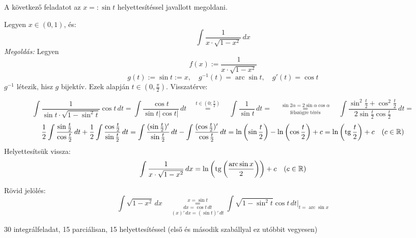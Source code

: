 \documentclass[a4paper,11.5pt]{article}
\DeclareMathOperator{\tg}{tg}
\DeclareMathOperator{\arc}{arc}
\begin{document}
	\begin{exercise}A következő feladatot az $x=:\sin t$ helyettesítéssel javallott megoldani. 
		
		Legyen $x\in(0,1)$, és:
		\[ \int\frac{1}{x\cdot\sqrt{1-x^2}}\,dx \]
		\textit{Megoldás:} Legyen
		\[ f(x):=\frac{1}{x\cdot\sqrt{1-x^2}} \]
		\[ g(t) := \sin t := x,\quad g^{-1}(t) = \arc\sin t,\quad g'(t) = \cos t \]
		$g^{-1}$ létezik, hisz $g$ bijektív. Ezek alapján $t\in\left(0,\frac{\pi}{2} \right)$. Visszatérve:
		
		\[ \int\frac{1}{\sin t\cdot\sqrt{1-\sin^2t}}\cos t\,dt=\int\frac{\cos t}{\sin t|\cos t|}\,dt\quad \overset{t\in\left(0;\frac{\pi}{2}\right)}{=}\quad\int\frac{1}{\sin t}\,dt=\quad \overset{\sin2\alpha=2\sin\alpha\cos\alpha}{\underset{\text{félszögre térés}}{=}}\quad \int\frac{\sin^2\frac{t}{2}+\cos^2\frac{t}{2}}{2\sin\frac{t}{2}\cos\frac{t}{2}}\,dt=\]
		\[\frac{1}{2}\int\frac{\sin\frac{t}{2}}{\cos\frac{t}{2}}\,dt+\frac{1}{2}\int\frac{\cos\frac{t}{2}}{\sin\frac{t}{2}}\,dt=\int\frac{(\sin\frac{t}{2})'}{\sin\frac{t}{2}}\,dt-\int\frac{(\cos\frac{t}{2})'}{\cos\frac{t}{2}}\,dt=\ln\left(\sin\frac{t}{2}\right)-\ln\left(\cos\frac{t}{2}\right)+c=\ln\left(\tg\frac{t}{2}\right)+c\quad (c\in\R) \]
		Helyettesítsük vissza:
		\[\int\frac{1}{x\cdot\sqrt{1-x^2}}\,dx=\ln\left(\tg\left(\frac{\arc\sin x}{2}\right)\right)+c\quad (c\in\R) \]
	\end{exercise}
	\begin{note}
		Rövid jelölés:
		\[ \int\sqrt{1-x^2}\,dx\quad \overset{x=\sin t}{\underset{(x)'\,dx=(\sin t)'\,dt}{\underset{dx=\cos t\,dt}{=}}}\int\sqrt{1-\sin^2 t}\cos t\,dt\big|_{t=\arc\sin x} \]
	\end{note}
	\begin{exercise}
		30 integrálfeladat, 15 parciálisan, 15 helyettesítéssel (első és második szabállyal ez utóbbit vegyesen)
	\end{exercise}
\end{document}
